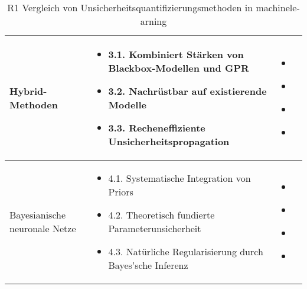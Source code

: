 \begin{otherlanguage}{ngerman}
\begin{table}[!htpb]
\begin{tabularx}{\textwidth}{|l|X|X|}
    \multirow{7}{*}{Hybrid-Methoden} &
    \begin{itemize}[topsep=0em, itemsep=0em, leftmargin=*, label={}]
      \item 3.1. Kombiniert Stärken von Blackbox-Modellen und GPR
      \item 3.2. Nachrüstbar auf existierende Modelle
      \item 3.3. Recheneffiziente Unsicherheitspropagation
    \end{itemize}
    &
    \begin{itemize}[topsep=0em, itemsep=0em, leftmargin=*, label={}]
      \item \parencite{perdikaris2017nonlinear}
      \item \parencite[S.~5–6]{perdikaris2017nonlinear}
      \item \parencite[S.~6]{perdikaris2017nonlinear}
      \item \parencite{liu2020multifidelity}
    \end{itemize}
    \\ \hline

    \multirow{7}{*}{\gls{Bayesianische neuronale Netze}} &
    \begin{itemize}[topsep=0em, itemsep=0em, leftmargin=*, label={}]
      \item 4.1. Systematische Integration von Priors
      \item 4.2. Theoretisch fundierte Parameterunsicherheit
      \item 4.3. Natürliche Regularisierung durch Bayes'sche Inferenz
    \end{itemize}
    &
    \begin{itemize}[topsep=0em, itemsep=0em, leftmargin=*, label={}]
      \item \parencite{gal2016uncertainty}
      \item \parencite[Kap.~2.3]{gal2016uncertainty}
      \item \parencite[S.~40–41]{gal2016uncertainty}
      \item \parencite[S.~41–42]{gal2016uncertainty}
    \end{itemize}
    \\ \hline
    
  \end{tabularx}
  \caption{R1 Vergleich von Unsicherheitsquantifizierungsmethoden in \gls{machinelearning}}
  \label{tab:chapter6r1}
\end{table}



\end{otherlanguage}
